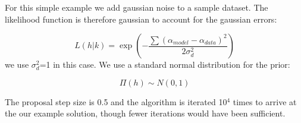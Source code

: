 For this simple example we add gaussian noise to a sample dataset. The likelihood function is therefore gaussian to account for the gaussian errors:

\begin{equation} \label{likely}
L\left(h|%
k\right)=\exp\left(- \frac{\sum({\alpha}_{model}-\alpha_{data})^2}{2\sigma_{d}^2}\right)
\end{equation} 
we use $\sigma_{d}^2$=1 in this case. We use a standard normal distribution for the prior:

\begin{equation}\label{prior_verify}
\Pi(h) \sim N(0,1)
\end{equation}

The proposal step size is 0.5 and the algorithm is iterated 10$^4$ times to arrive at the our example solution, though fewer iterations would have been sufficient. 
















